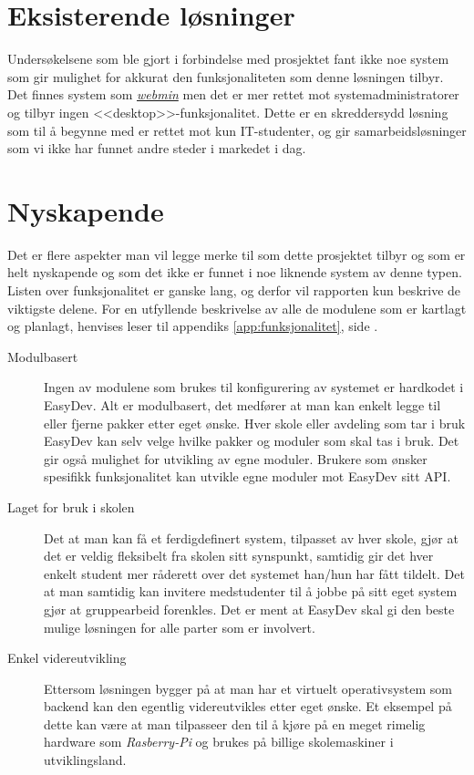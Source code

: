 \section{Eksisterende løsninger}
Undersøkelsene som ble gjort i forbindelse med prosjektet fant ikke noe system som gir mulighet for akkurat den funksjonaliteten som denne løsningen tilbyr. Det finnes system som \href{http://en.wikipedia.org/wiki/Webmin}{\textit{webmin}} men det er mer rettet mot systemadministratorer og tilbyr ingen <<desktop>>-funksjonalitet. Dette er en skreddersydd løsning som til å begynne med er rettet mot kun IT-studenter, og gir samarbeidsløsninger som vi ikke har funnet andre steder i markedet i dag.

\section{Nyskapende}
Det er flere aspekter man vil legge merke til som dette prosjektet tilbyr og som er helt nyskapende og som det ikke er funnet i noe liknende system av denne typen. Listen over funksjonalitet er ganske lang, og derfor vil rapporten kun beskrive de viktigste delene. For en utfyllende beskrivelse av alle de modulene som er kartlagt og planlagt, henvises leser til appendiks \ref{app:funksjonalitet}, side \pageref{app:funksjonalitet}.


\begin{description}
\item[Modulbasert] Ingen av modulene som brukes til konfigurering av systemet er hardkodet i EasyDev. Alt er modulbasert, det medfører at man kan enkelt legge til eller fjerne pakker etter eget ønske. Hver skole eller avdeling som tar i bruk EasyDev kan selv velge hvilke pakker og moduler som skal tas i bruk. Det gir også mulighet for utvikling av egne moduler. Brukere som ønsker spesifikk funksjonalitet kan utvikle egne moduler mot EasyDev sitt API. 
\item[Laget for bruk i skolen] Det at man kan få et ferdigdefinert system, tilpasset av hver skole, gjør at det er veldig fleksibelt fra skolen sitt synspunkt, samtidig gir det hver enkelt student mer råderett over det systemet han/hun har fått tildelt. Det at man samtidig kan invitere medstudenter til å jobbe på sitt eget system gjør at gruppearbeid forenkles. Det er ment at EasyDev skal gi den beste mulige løsningen for alle parter som er involvert.
\item[Enkel videreutvikling]
Ettersom løsningen bygger på at man har et virtuelt operativsystem som backend kan den egentlig videreutvikles etter eget ønske. Et eksempel på dette kan være at man tilpasseer den til å kjøre på en meget rimelig hardware som \textit{Rasberry-Pi} og brukes på billige skolemaskiner i utviklingsland.
\end{description}